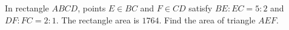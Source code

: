 In rectangle $ABCD$, points $E\in BC$ and $F\in CD$ satisfy $BE:EC=5:2$ and $DF:FC=2:1$. The rectangle area is $1764$. Find the area of triangle $AEF$.
